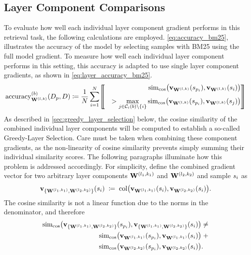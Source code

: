 \subsection{Layer Component Comparisons}
To evaluate how well each individual layer component gradient performs in this retrieval task, the following calculations are employed. \autoref{eq:accuracy_bm25}, illustrates the accuracy of the model by selecting samples with BM25 using the full model gradient. To measure how well each individual layer component performs in this setting, this accuracy is adapted to use single layer component gradients, as shown in \autoref{eq:layer_accuracy_bm25}.
\begin{equation}
  \begin{split}
    \operatorname{accuracy}^{(b)}_{\Wlk}(D_{p},D)
    \coloneqq \frac{1}{N}\sum_{i=1}^{N}
        \Iverson*{
        \begin{aligned}
            \,\simcos\bigl(\vXspi[\Wlk],\vXsi[\Wlk]\bigr)
            \\[4pt] %
            \quad>
            \max_{j\in\mathcal{C}_{i}(b)\setminus\{i\}}
            \simcos\bigl(\vXspi[\Wlk],\vXsj[\Wlk]\bigr)
        \end{aligned}
        }
  \end{split}
  \label{eq:layer_accuracy_bm25}
\end{equation}
As described in \autoref{sec:greedy_layer_selection} below, the cosine similarity of the combined individual layer components will be computed to establish a so-called Greedy-Layer Selection. Care must be taken when combining these component gradients, as the non-linearity of cosine similarity prevents simply summing their individual similarity scores. The following paragraphs illuminate how this problem is addressed accordingly. For simplicity, define the combined gradient vector for two arbitrary layer components $\Wlonekone$ and $\Wltwoktwo$ and sample $\si$ as
\begin{equation}
\vXsi[\{ \Wlonekone, \Wltwoktwo \}]
\;\coloneqq\;
\operatorname{col}\bigl( \vXsi[\Wlonekone], \vXsi[\Wltwoktwo] \bigr).
\end{equation}
The cosine similarity is not a linear function due to the norms in the denominator, and therefore
\begin{equation}
    \begin{split}
        \simcos\bigl(\vXspi[\{ \Wlonekone, \Wltwoktwo \}], \vXsi[\{ \Wlonekone, \Wltwoktwo \}] \bigr) & \neq \\
        \simcos\bigl(\vXspi[\Wlonekone], \vXsi[\Wlonekone] \bigr) & \; + \\ \simcos\bigl(\vXspi[\Wltwoktwo], \vXsi[\Wltwoktwo] \bigr) & .
    \end{split}
    \label{eq:cosine_similarity_non_linearity_example}
\end{equation}
